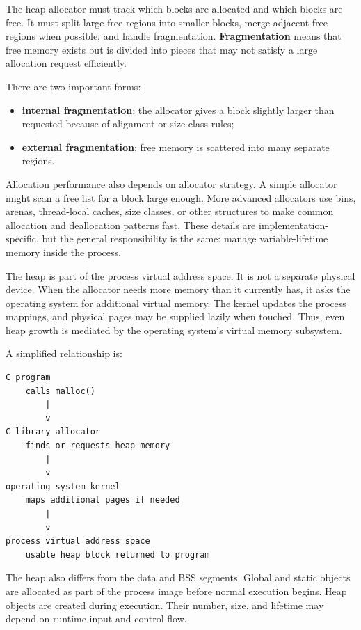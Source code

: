 The heap allocator must track which blocks are allocated and which blocks are free. It must split large free regions into smaller blocks, merge adjacent free regions when possible, and handle fragmentation. \textbf{Fragmentation} means that free memory exists but is divided into pieces that may not satisfy a large allocation request efficiently.

There are two important forms:

\begin{itemize}
    \item \textbf{internal fragmentation}: the allocator gives a block slightly larger than requested because of alignment or size-class rules;
    \item \textbf{external fragmentation}: free memory is scattered into many separate regions.
\end{itemize}

Allocation performance also depends on allocator strategy. A simple allocator might scan a free list for a block large enough. More advanced allocators use bins, arenas, thread-local caches, size classes, or other structures to make common allocation and deallocation patterns fast. These details are implementation-specific, but the general responsibility is the same: manage variable-lifetime memory inside the process.

The heap is part of the process virtual address space. It is not a separate physical device. When the allocator needs more memory than it currently has, it asks the operating system for additional virtual memory. The kernel updates the process mappings, and physical pages may be supplied lazily when touched. Thus, even heap growth is mediated by the operating system's virtual memory subsystem.

A simplified relationship is:

\begin{verbatim}
C program
    calls malloc()
        |
        v
C library allocator
    finds or requests heap memory
        |
        v
operating system kernel
    maps additional pages if needed
        |
        v
process virtual address space
    usable heap block returned to program
\end{verbatim}

The heap also differs from the data and BSS segments. Global and static objects are allocated as part of the process image before normal execution begins. Heap objects are created during execution. Their number, size, and lifetime may depend on runtime input and control flow.

